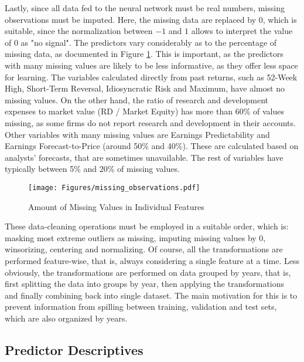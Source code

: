 		Lastly, since all data fed to the neural network must be real numbers, missing observations must be imputed. Here, the missing data are replaced by 0, which is suitable, since the normalization between $-1$ and $1$ allows to interpret the value of $0$ as "no signal". The predictors vary considerably as to the percentage of missing data, as documented in Figure \ref{fig:missing_observations}. This is important, as the predictors with many missing values are likely to be less informative, as they offer less space for learning. The variables calculated directly from past returns, such as 52-Week High, Short-Term Reversal, Idiosyncratic Risk and Maximum, have almost no missing values. On the other hand, the ratio of research and development expenses to market value (RD / Market Equity) has more than 60\% of values missing, as some firms do not report research and development in their accounts. Other variables with many missing values are Earnings Predictability and Earnings Forecast-to-Price (around 50\% and 40\%). These are calculated based on analysts' forecasts, that are sometimes unavailable. The rest of variables have typically between 5\% and 20\% of missing values.  
		
		\begin{center}
			\begin{figure}
				\texttt{[image: Figures/missing\_observations.pdf]}
				\caption{Amount of Missing Values in Individual Features}
				\label{fig:missing_observations}
			\end{figure}
		\end{center}
		
		These data-cleaning operations must be employed in a suitable order, which is: masking most extreme outliers as missing, imputing missing values by $0$, winsorizing, centering and normalizing. Of course, all the transformations are performed feature-wise, that is, always considering a single feature at a time. Less obviously, the transformations are performed on data grouped by years, that is, first splitting the data into groups by year, then applying the transformations and finally combining back into single dataset. The main motivation for this is to prevent information from spilling between training, validation and test sets, which are also organized by years.  
	
	\subsection{Predictor Descriptives}   	
	
